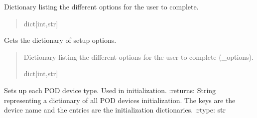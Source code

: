 \documentclass[letterpaper,10pt,english]{sphinxmanual}
\begin{document}
\begin{fulllineitems}

\begin{fulllineitems}
\label{\detokenize{Setup.SetupAllDevices:Setup.SetupAllDevices.Setup_PodDevices.SetupAll._options}}
\pysigstartsignatures
{}
\pysigstopsignatures
\sphinxAtStartPar
Dictionary listing the different options for the user to complete.
\begin{quote}\begin{description}
\sphinxAtStartPar
dict{[}int,str{]}

\end{description}\end{quote}

\end{fulllineitems}


\begin{fulllineitems}
\label{\detokenize{Setup.SetupAllDevices:Setup.SetupAllDevices.Setup_PodDevices.SetupAll.GetOptions}}
\pysigstartsignatures
{}
\pysigstopsignatures
\sphinxAtStartPar
Gets the dictionary of setup options.
\begin{quote}\begin{description}
\sphinxAtStartPar
Dictionary listing the different options for the user to complete (\_options).

\sphinxAtStartPar
dict{[}int,str{]}

\end{description}\end{quote}

\end{fulllineitems}


\begin{fulllineitems}
\label{\detokenize{Setup.SetupAllDevices:Setup.SetupAllDevices.Setup_PodDevices.SetupAll.GetPODparametersInit}}
\pysigstartsignatures
{}
\pysigstopsignatures
\sphinxAtStartPar
Sets up each POD device type. Used in initialization.
:returns: String representing a dictionary of all POD devices initialization. The keys are the                 device name and the entries are the initialization dictionaries.
:rtype: str


\end{fulllineitems}
\end{fulllineitems}
\end{document}
